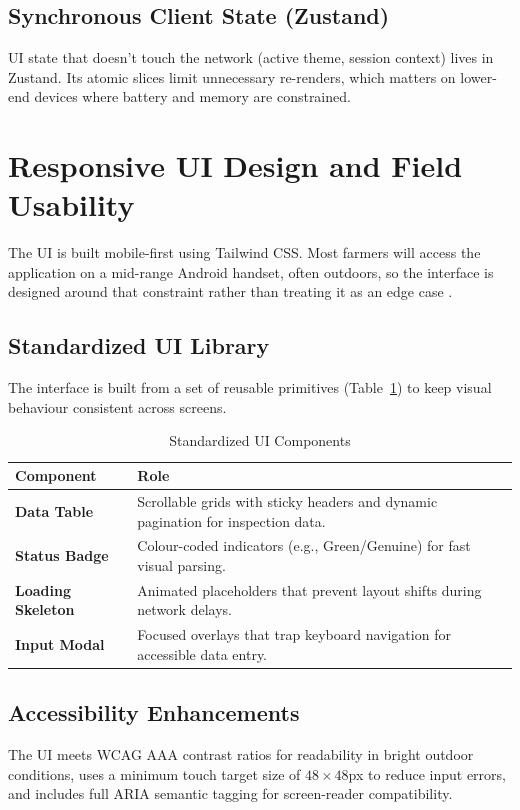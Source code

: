 \subsection{Synchronous Client State (Zustand)}
UI state that doesn't touch the network (active theme, session context) lives in Zustand. Its atomic slices limit unnecessary re-renders, which matters on lower-end devices where battery and memory are constrained.

\section{Responsive UI Design and Field Usability}
\label{sec:responsive-ui}

The UI is built mobile-first using Tailwind CSS. Most farmers will access the application on a mid-range Android handset, often outdoors, so the interface is designed around that constraint rather than treating it as an edge case \cite{singh2026impact}.

\subsection{Standardized UI Library}
The interface is built from a set of reusable primitives (Table~\ref{tab:ui-components}) to keep visual behaviour consistent across screens.

\begin{table}[htbp]
\centering
\caption{Standardized UI Components}
\label{tab:ui-components}
\small
\renewcommand{\arraystretch}{1.1}
\begin{tabularx}{\textwidth}{|p{3.8cm}|X|}
\hline
\textbf{Component} & \textbf{Role} \\
\hline
\textbf{Data Table} & Scrollable grids with sticky headers and dynamic pagination for inspection data. \\
\hline
\textbf{Status Badge} & Colour-coded indicators (e.g., Green/Genuine) for fast visual parsing. \\
\hline
\textbf{Loading Skeleton} & Animated placeholders that prevent layout shifts during network delays. \\
\hline
\textbf{Input Modal} & Focused overlays that trap keyboard navigation for accessible data entry. \\
\hline
\end{tabularx}
\end{table}

\subsection{Accessibility Enhancements}
The UI meets WCAG AAA contrast ratios for readability in bright outdoor conditions, uses a minimum touch target size of $48\times 48$px to reduce input errors, and includes full ARIA semantic tagging for screen-reader compatibility.
